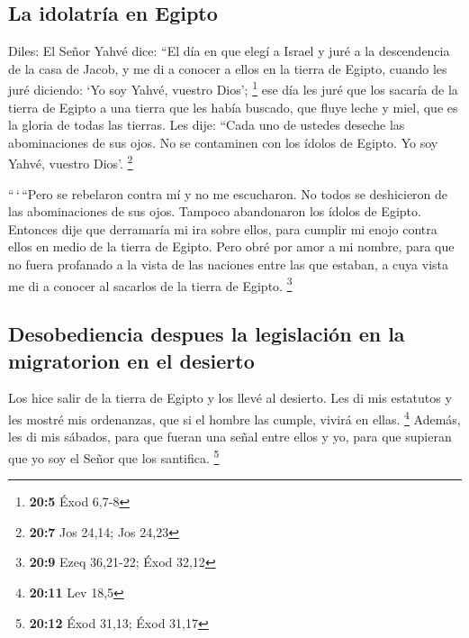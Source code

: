\hypertarget{la-idolatruxeda-en-egipto}{%
\subsection{La idolatría en Egipto}\label{la-idolatruxeda-en-egipto}}

 Diles: El Señor Yahvé dice: ``El día en que elegí a
Israel y juré a la descendencia de la casa de Jacob, y me di a conocer a
ellos en la tierra de Egipto, cuando les juré diciendo: `Yo soy Yahvé,
vuestro Dios'; \footnote{\textbf{20:5} Éxod 6,7-8}  ese
día les juré que los sacaría de la tierra de Egipto a una tierra que les
había buscado, que fluye leche y miel, que es la gloria de todas las
tierras.  Les dije: ``Cada uno de ustedes deseche las
abominaciones de sus ojos. No se contaminen con los ídolos de Egipto. Yo
soy Yahvé, vuestro Dios'. \footnote{\textbf{20:7} Jos 24,14; Jos 24,23}

 ``\,`\,``Pero se rebelaron contra mí y no me escucharon.
No todos se deshicieron de las abominaciones de sus ojos. Tampoco
abandonaron los ídolos de Egipto. Entonces dije que derramaría mi ira
sobre ellos, para cumplir mi enojo contra ellos en medio de la tierra de
Egipto.  Pero obré por amor a mi nombre, para que no fuera
profanado a la vista de las naciones entre las que estaban, a cuya vista
me di a conocer al sacarlos de la tierra de Egipto. \footnote{\textbf{20:9}
  Ezeq 36,21-22; Éxod 32,12}

\hypertarget{desobediencia-despues-la-legislaciuxf3n-en-la-migratorion-en-el-desierto}{%
\subsection{Desobediencia despues la legislación en la migratorion en el
desierto}\label{desobediencia-despues-la-legislaciuxf3n-en-la-migratorion-en-el-desierto}}

 Los hice salir de la tierra de Egipto y los llevé al
desierto.  Les di mis estatutos y les mostré mis
ordenanzas, que si el hombre las cumple, vivirá en ellas. \footnote{\textbf{20:11}
  Lev 18,5}  Además, les di mis sábados, para que fueran
una señal entre ellos y yo, para que supieran que yo soy el Señor que
los santifica. \footnote{\textbf{20:12} Éxod 31,13; Éxod 31,17}

